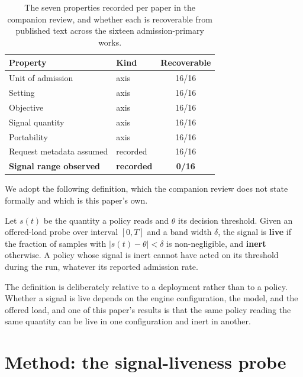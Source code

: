 \begin{table}[t]
\centering
\caption{The seven properties recorded per paper in the companion review, and
whether each is recoverable from published text across the sixteen
admission-primary works.}
\label{tab:properties}
\small
\begin{tabular}{llc}
\toprule
\textbf{Property} & \textbf{Kind} & \textbf{Recoverable} \\
\midrule
Unit of admission        & axis     & 16/16 \\
Setting                  & axis     & 16/16 \\
Objective                & axis     & 16/16 \\
Signal quantity          & axis     & 16/16 \\
Portability              & axis     & 16/16 \\
Request metadata assumed & recorded & 16/16 \\
\textbf{Signal range observed} & \textbf{recorded} & \textbf{0/16} \\
\bottomrule
\end{tabular}
\end{table}

We adopt the following definition, which the companion review does not state
formally and which is this paper's own.

\begin{definition}
\label{def:liveness}
Let $s(t)$ be the quantity a policy reads and $\theta$ its decision threshold.
Given an offered-load probe over interval $[0,T]$ and a band width
$\delta$, the signal is \textbf{live} if the fraction of samples with
$|s(t) - \theta| < \delta$ is non-negligible, and \textbf{inert} otherwise.
A policy whose signal is inert cannot have acted on its threshold during the
run, whatever its reported admission rate.
\end{definition}

The definition is deliberately relative to a deployment rather than to a policy.
Whether a signal is live depends on the engine configuration, the model, and the
offered load, and one of this paper's results is that the same policy reading
the same quantity can be live in one configuration and inert in another.

\section{Method: the signal-liveness probe}
\label{sec:method}

